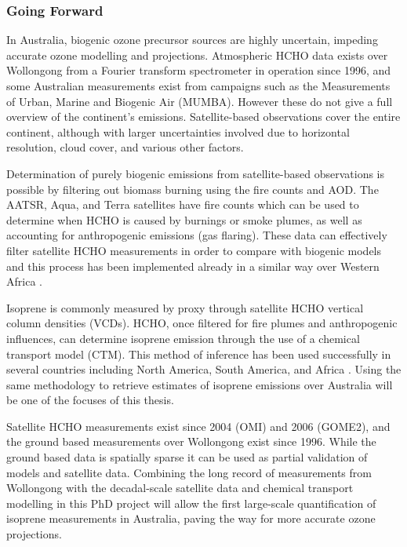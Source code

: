 \subsubsection{Going Forward}
In Australia, biogenic ozone precursor sources are highly uncertain, impeding accurate ozone modelling and projections.
Atmospheric HCHO data exists over Wollongong from a Fourier transform spectrometer in operation since 1996, and some Australian measurements exist from campaigns such as the Measurements of Urban, Marine and Biogenic Air (MUMBA).
However these do not give a full overview of the continent's emissions. Satellite-based observations cover the entire continent, although with larger uncertainties involved due to horizontal resolution, cloud cover, and various other factors. 

Determination of purely biogenic emissions from satellite-based observations is possible by filtering out biomass burning using the fire counts and AOD.
The AATSR, Aqua, and Terra satellites have fire counts which can be used to determine when HCHO is caused by burnings or smoke plumes, as well as accounting for anthropogenic emissions (gas flaring).
These data can effectively filter satellite HCHO measurements in order to compare with biogenic models and this process has been implemented already in a similar way over Western Africa \cite{Marais_2012}.

Isoprene is commonly measured by proxy through satellite HCHO vertical column densities (VCDs). HCHO, once filtered for fire plumes and anthropogenic influences, can determine isoprene emission through the use of a chemical transport model (CTM).
This method of inference has been used successfully in several countries including North America\cite{Palmer_2003}, South America\cite{Barkley_2013}, and Africa \cite{Marais_2012}.
Using the same methodology to retrieve estimates of isoprene emissions over Australia will be one of the focuses of this thesis.

Satellite HCHO measurements exist since 2004 (OMI) and 2006 (GOME2), and the ground based measurements over Wollongong exist since 1996. While the ground based data is spatially sparse it can be used as partial validation of models and satellite data. 
Combining the long record of measurements from Wollongong with the decadal-scale satellite data and chemical transport modelling in this PhD project will allow the first large-scale quantification of isoprene measurements in Australia, paving the way for more accurate ozone projections.
